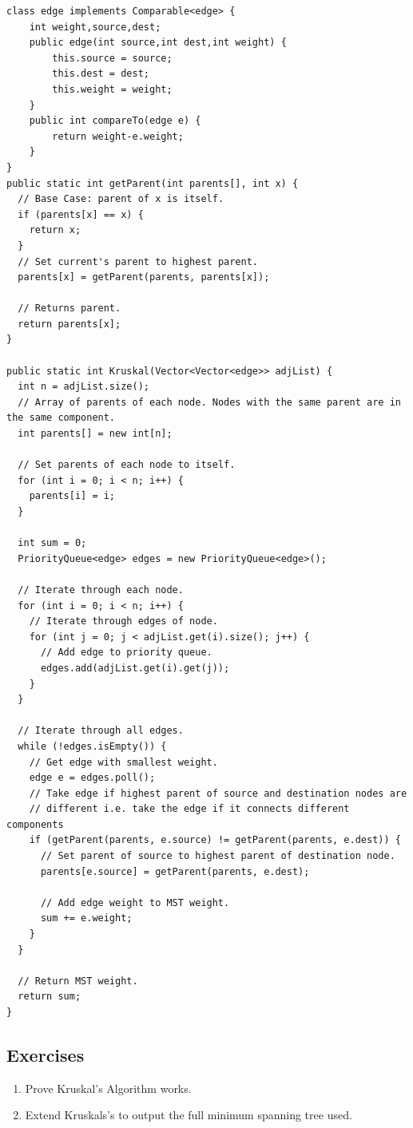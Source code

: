 \documentclass[11pt,oneside]{book}
\begin{document}
\begin{lstlisting}
class edge implements Comparable<edge> {
    int weight,source,dest;
    public edge(int source,int dest,int weight) {
        this.source = source;
        this.dest = dest;
        this.weight = weight;
    }
    public int compareTo(edge e) {
        return weight-e.weight;
    }
}
public static int getParent(int parents[], int x) {
  // Base Case: parent of x is itself.
  if (parents[x] == x) {
    return x;
  }
  // Set current's parent to highest parent.
  parents[x] = getParent(parents, parents[x]);

  // Returns parent.
  return parents[x];
}

public static int Kruskal(Vector<Vector<edge>> adjList) {
  int n = adjList.size();
  // Array of parents of each node. Nodes with the same parent are in the same component.
  int parents[] = new int[n];

  // Set parents of each node to itself.
  for (int i = 0; i < n; i++) {
    parents[i] = i;
  }

  int sum = 0;
  PriorityQueue<edge> edges = new PriorityQueue<edge>();

  // Iterate through each node.
  for (int i = 0; i < n; i++) {
    // Iterate through edges of node.
    for (int j = 0; j < adjList.get(i).size(); j++) {
      // Add edge to priority queue.
      edges.add(adjList.get(i).get(j));
    }
  }

  // Iterate through all edges.
  while (!edges.isEmpty()) {
    // Get edge with smallest weight.
    edge e = edges.poll();
    // Take edge if highest parent of source and destination nodes are
    // different i.e. take the edge if it connects different components
    if (getParent(parents, e.source) != getParent(parents, e.dest)) {
      // Set parent of source to highest parent of destination node.
      parents[e.source] = getParent(parents, e.dest);
      
      // Add edge weight to MST weight.
      sum += e.weight;
    }
  }

  // Return MST weight.
  return sum;
}
\end{lstlisting}

\subsection{Exercises}

\begin{enumerate}
\item Prove Kruskal's Algorithm works.
\item Extend Kruskals's to output the full minimum spanning tree used.
\end{enumerate}
\end{document}
